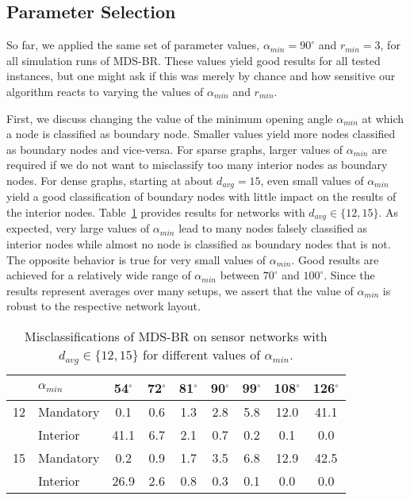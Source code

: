 \documentclass{llncs}
\begin{document}
\subsection{Parameter Selection}\label{ssec:parameter_tuning}
So far, we applied the same set of parameter values, $\alpha_{min} = 90^\circ$ and $r_{min} = 3$, for all simulation runs of MDS-BR.
These values yield good results for all tested instances, but one might ask if this was merely by chance and how sensitive our algorithm reacts to varying the values of $\alpha_{min}$ and $r_{min}$.

First, we discuss changing the value of the minimum opening angle $\alpha_{min}$ at which a node is classified as boundary node.
Smaller values yield more nodes classified as boundary nodes and vice-versa.
For sparse graphs, larger values of $\alpha_{min}$ are required if we do not want to misclassify too many interior nodes as boundary nodes.
For dense graphs, starting at about $d_{avg}=15$, even small values of $\alpha_{min}$ yield a good classification of boundary nodes with little impact on the results of the interior nodes.
Table~\ref{tab:mdsbr_angle} provides results for networks with $d_{avg} \in \{12,15\}$.
As expected, very large values of $\alpha_{min}$ lead to many nodes falsely classified as interior nodes while almost no node is classified as boundary nodes that is not.
The opposite behavior is true for very small values of $\alpha_{min}$.
Good results are achieved for a relatively wide range of $\alpha_{min}$ between $70^\circ$ and $100^\circ$.
Since the results represent averages over many setups, we assert that the value of $\alpha_{min}$ is robust to the respective network layout.

\begin{table}[b]
\setlength\tabcolsep{5pt}
\centering
\caption{Misclassifications of MDS-BR on sensor networks with $d_{avg} \in \{12,15\}$ for different values of $\alpha_{min}$.}\label{tab:mdsbr_angle}
\begin{tabular}{cl||ccccccc}
& $\alpha_{min}$ & 54$^\circ$ & 72$^\circ$ & 81$^\circ$ & 90$^\circ$ & 99$^\circ$ & 108$^\circ$ & 126$^\circ$ \\
\hline
12 & Mandatory &  0.1 & 0.6 & 1.3 & 2.8 & 5.8 & 12.0 & 41.1 \\
   & Interior  & 41.1 & 6.7 & 2.1 & 0.7 & 0.2 &  0.1 &  0.0 \\
15 & Mandatory &  0.2 & 0.9 & 1.7 & 3.5 & 6.8 & 12.9 & 42.5 \\
   & Interior  & 26.9 & 2.6 & 0.8 & 0.3 & 0.1 &  0.0 &  0.0   
\end{tabular}
\end{table}
\end{document}
